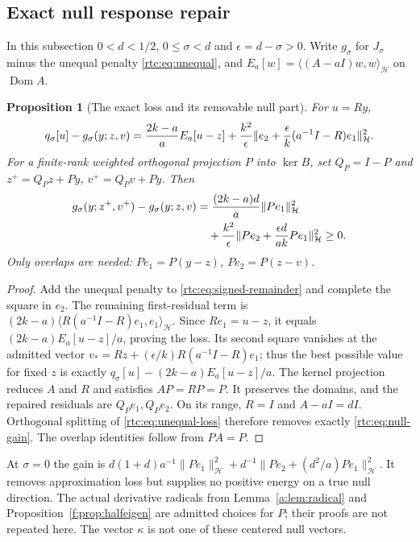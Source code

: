\documentclass[11pt,a4paper]{article}
\numberwithin{equation}{section}
\newtheorem{proposition}[theorem]{Proposition}
\theoremstyle{definition}\newtheorem{definition}[theorem]{Definition}
\theoremstyle{remark}\newtheorem{remark}[theorem]{Remark}
\newcommand{\Hh}{\mathcal H}\newcommand{\Hw}{\mathcal H}
\newcommand{\ip}[2]{\langle#1,#2\rangle}\newcommand{\norm}[1]{\lVert#1\rVert}\newcommand{\abs}[1]{\lvert#1\rvert}
\begin{document}
\subsection{Exact null response repair}\label{rtc:sec:null-repair}
In this subsection $0<d<1/2$, $0\le\sigma<d$ and
$\epsilon=d-\sigma>0$. Write $g_\sigma$ for $J_\sigma$ minus the unequal
penalty \eqref{rtc:eq:unequal}, and
$E_a[w]=\ip{(A-aI)w}{w}_{\Hh}$ on $\operatorname{Dom}A$.
\begin{proposition}[The exact loss and its removable null part]\label{rtc:prop:null-loss}
For $u=Ry$,
\begin{equation}\label{rtc:eq:unequal-loss}
 q_\sigma[u]-g_\sigma(y;z,v)
 ={2k-a\over a}E_a[u-z]
 +{k^2\over\epsilon}
 \norm{e_2+{\epsilon\over k}(a^{-1}I-R)e_1}_{\Hh}^2.
\end{equation}
For a finite-rank weighted orthogonal projection $P$ into $\ker B$, set
$Q_P=I-P$ and
$z^+=Q_Pz+Py$, $v^+=Q_Pv+Py$. Then
\begin{align}\label{rtc:eq:null-gain}
 g_\sigma(y;z^+,v^+)-g_\sigma(y;z,v)
 &={(2k-a)d\over a}\norm{Pe_1}_{\Hh}^2\notag\\
 &\quad+{k^2\over\epsilon}
 \norm{Pe_2+{\epsilon d\over ak}Pe_1}_{\Hh}^2\ge0.
\end{align}
Only overlaps are needed: $Pe_1=P(y-z)$, $Pe_2=P(z-v)$.
\end{proposition}
\begin{proof}
Add the unequal penalty to \eqref{rtc:eq:signed-remainder} and complete
the square in $e_2$. The remaining first-residual term is
$(2k-a)\ip{R(a^{-1}I-R)e_1}{e_1}_{\Hh}$.
Since $Re_1=u-z$, it equals $(2k-a)E_a[u-z]/a$, proving the loss.
Its second square vanishes at the admitted vector
$v_*=Rz+(\epsilon/k)R(a^{-1}I-R)e_1$; thus the best possible value for
fixed $z$ is exactly $q_\sigma[u]-(2k-a)E_a[u-z]/a$.
The kernel projection reduces $A$ and $R$ and satisfies $AP=RP=P$.
It preserves the domains, and the repaired residuals are $Q_Pe_1,Q_Pe_2$.
On its range, $R=I$ and $A-aI=dI$. Orthogonal splitting of
\eqref{rtc:eq:unequal-loss} therefore removes exactly
\eqref{rtc:eq:null-gain}. The overlap identities follow from $PA=P$.
\end{proof}
At $\sigma=0$ the gain is
$d(1+d)a^{-1}\norm{Pe_1}_{\Hh}^2+
 d^{-1}\norm{Pe_2+(d^2/a)Pe_1}_{\Hh}^2$.
It removes approximation loss but supplies no positive energy on a true
null direction. The actual derivative radicals from
Lemma~\ref{a:lem:radical} and Proposition~\ref{f:prop:halfeigen} are
admitted choices for $P$; their proofs are not repeated here.
The vector $\kappa$ is not one of these centered null vectors.
\end{document}
